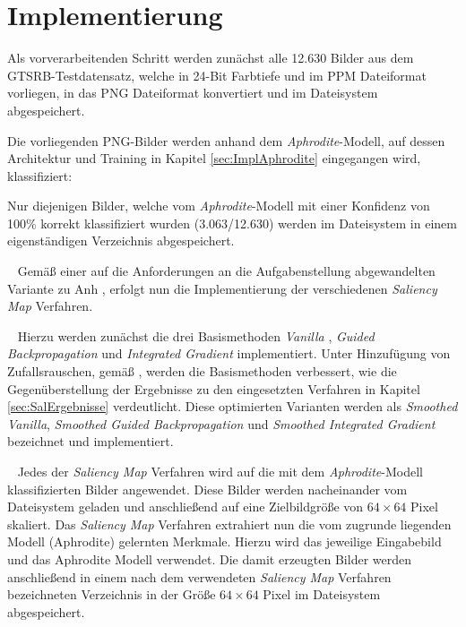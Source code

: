 \section{Implementierung}

Als vorverarbeitenden Schritt werden zunächst alle 12.630 Bilder aus dem GTSRB-Testdatensatz, welche in 24-Bit Farbtiefe und im \ac{PPM} Dateiformat vorliegen, in das \ac{PNG} Dateiformat konvertiert und im Dateisystem abgespeichert.


Die vorliegenden PNG-Bilder werden anhand dem \textit{Aphrodite}-Modell, auf dessen Architektur und Training in Kapitel \ref{sec:ImplAphrodite} eingegangen wird, klassifiziert: 

Nur diejenigen Bilder, welche vom \textit{Aphrodite}-Modell mit einer Konfidenz von 100\% korrekt klassifiziert wurden (3.063/12.630) werden im Dateisystem in einem eigenständigen Verzeichnis abgespeichert.

~\newline
Gemäß einer auf die Anforderungen an die Aufgabenstellung abgewandelten Variante zu Anh \cite{anh_implementations_2019}, erfolgt nun die Implementierung der verschiedenen \textit{Saliency Map} Verfahren.

~\newline
Hierzu werden zunächst die drei Basismethoden \textit{Vanilla} \cite{simonyan_deep_2013}, \textit{Guided Backpropagation} \cite{springenberg_striving_2014} und \textit{Integrated Gradient} \cite{sundararajan_axiomatic_2017} implementiert. 
Unter Hinzufügung von Zufallsrauschen, gemäß \cite{smilkov_smoothgrad:_2017}, werden die Basismethoden verbessert, wie die Gegenüberstellung der Ergebnisse zu den eingesetzten Verfahren in Kapitel \ref{sec:SalErgebnisse} verdeutlicht.
Diese optimierten Varianten werden als \textit{Smoothed Vanilla}, \textit{Smoothed Guided Backpropagation} und \textit{Smoothed Integrated Gradient} bezeichnet und implementiert.

~\newline
Jedes der \textit{Saliency Map} Verfahren wird auf die mit dem \textit{Aphrodite}-Modell klassifizierten Bilder angewendet. Diese Bilder werden nacheinander vom Dateisystem geladen und anschließend auf eine Zielbildgröße von $64 \times 64 $ Pixel skaliert. 
Das \textit{Saliency Map} Verfahren extrahiert nun die vom zugrunde liegenden Modell (Aphrodite) gelernten Merkmale. Hierzu wird das jeweilige Eingabebild und das Aphrodite Modell verwendet. 
Die damit erzeugten Bilder werden anschließend in einem nach dem verwendeten \textit{Saliency Map} Verfahren bezeichneten Verzeichnis in der Größe $64 \times 64 $ Pixel im Dateisystem abgespeichert.

